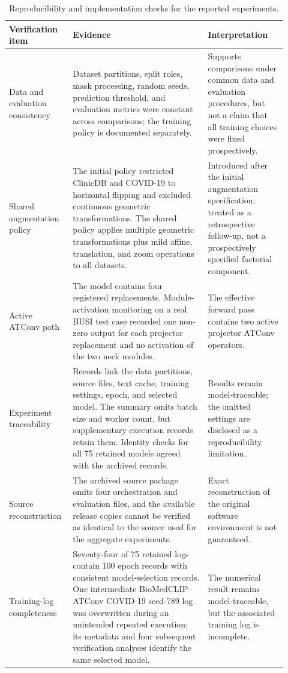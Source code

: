 \begin{table}[!htbp]
\centering
\caption{Reproducibility and implementation checks for the reported experiments.}
\label{tab:protocol_implementation_audit}
\scriptsize
\setlength{\tabcolsep}{3.0pt}
\renewcommand{\arraystretch}{1.08}
\begin{tabular}{@{}>{\raggedright\arraybackslash}p{0.19\linewidth}>{\raggedright\arraybackslash}p{0.46\linewidth}>{\raggedright\arraybackslash}p{0.27\linewidth}@{}}
\toprule
Verification item & Evidence & Interpretation \\
\midrule
Data and evaluation consistency & Dataset partitions, split roles, mask
processing, random seeds, prediction threshold, and evaluation metrics were
constant across comparisons; the training policy is documented separately. &
Supports comparisons under common data and evaluation procedures, but not a
claim that all training choices were fixed prospectively. \\
\addlinespace[2pt]
Shared augmentation policy & The initial policy restricted ClinicDB and COVID-19
to horizontal flipping and excluded continuous geometric transformations. The
shared policy applies multiple geometric transformations plus mild affine,
translation, and zoom operations to all datasets. & Introduced after the initial
augmentation specification; treated as a retrospective follow-up, not a
prospectively specified factorial component. \\
\addlinespace[2pt]
Active ATConv path & The model contains four registered replacements. Module-activation
monitoring on a real BUSI test case recorded one non-zero output for each projector
replacement and no activation of the two neck modules. & The effective forward
pass contains two active projector ATConv operators. \\
\addlinespace[2pt]
Experiment traceability & Records link the data partitions, source files, text
cache, training settings, epoch, and selected model. The summary omits batch size
and worker count, but supplementary execution records retain them. Identity checks
for all 75 retained models agreed with the archived records. & Results remain
model-traceable; the omitted settings are disclosed as a reproducibility limitation. \\
\addlinespace[2pt]
Source reconstruction & The archived source package omits four orchestration and
evaluation files, and the available release copies cannot be verified as identical
to the source used for the aggregate experiments. & Exact reconstruction of the
original software environment is not guaranteed. \\
\addlinespace[2pt]
Training-log completeness & Seventy-four of 75 retained logs contain 100 epoch records with
consistent model-selection records. One intermediate BioMedCLIP--ATConv
COVID-19 seed-789 log was overwritten during an unintended repeated execution; its
metadata and four subsequent verification analyses identify the same selected
model. & The numerical result remains model-traceable, but the associated
training log is incomplete. \\
\bottomrule
\end{tabular}
\end{table}
